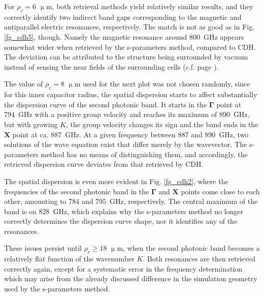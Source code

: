 For $\rho_c=6$ $\upmu$m, both retrieval methods yield relatively similar results, and they correctly identify two indirect band gaps corresponding to the magnetic and antiparallel electric resonances, respectively. The match is not as good as in Fig. \ref{fg_cdh5}, though. Namely the magnetic resonance around 800~GHz appears somewhat wider when retrieved by the s-parameters method, compared to CDH. The deviation can be attributed to the structure being surrounded by vacuum instead of sensing the near fields of the surrounding cells (c.f. page \pageref{cdhadvantages}).

The value of $\rho_c=8$ $\upmu$m used for the next plot was not chosen randomly, since for this inner capacitor radius, the spatial dispersion starts to affect substantially the dispersion curve of the second photonic band. It starts in the $\mathbf \Gamma$ point at 794~GHz with a positive group velocity and reaches its maximum of 890~GHz, but with growing $K$, the group velocity changes its sign and the band ends in the $\mathbf X$ point at ca. 887~GHz. At a given frequency between 887 and 890~GHz, two solutions of the wave equation exist that differ merely by the wavevector. The s-parameters method has no means of distinguishing them, and accordingly, the retrieved dispersion curve deviates from that retrieved by CDH.

The spatial dispersion is even more evident in Fig. \ref{fg_cdh2}, where the frequencies of the second photonic band in the $\mathbf \Gamma$ and $\mathbf X$ points come close to each other, amounting to 784 and 795~GHz, respectively. The central maximum of the band is on 828~GHz, which explains why the s-parameters	method no longer correctly determines the dispersion curve shape, nor it identifies any of the resonances.

These issues persist until $\rho_c \geq 18$ $\upmu$m, when the second photonic band becomes a relatively flat function of the wavenumber $K$. Both resonances are then retrieved correctly again, except for a systematic error in the frequency determination which may arise from the already discussed difference in the simulation geometry used by the s-parameters method.

